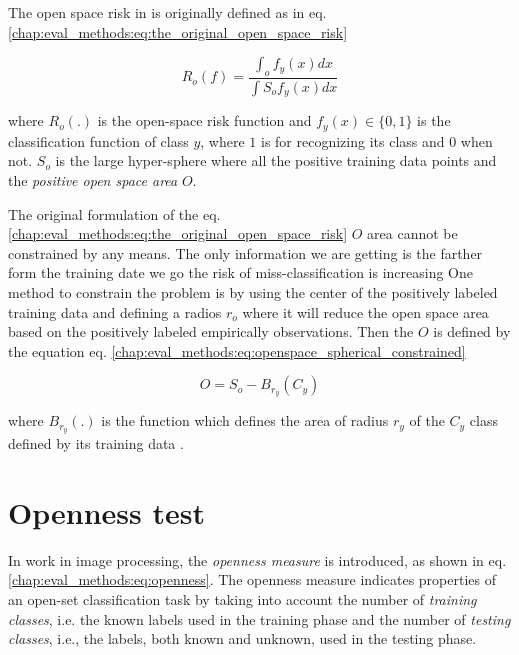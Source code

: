 {The open space risk in \parencite{scheirer2013toward} is originally defined as in eq. \ref{chap:eval_methods:eq:the_original_open_space_risk}

\begin{equation}\label{chap:eval_methods:eq:the_original_open_space_risk}
	R_{o}(f) = \frac{\int_{o} f_{y}(x) dx}{\int{S_{o}}  f_{y}(x) dx}

\end{equation}

\noindent
where $R_{o}(.)$ is the open-space risk function and $f_{y}(x)  \in \{0, 1\}$ is the classification function of class $y$, where $1$ is for recognizing its class and $0$ when not. $S_{o}$ is the large hyper-sphere where all the positive training data points and the \textit{positive open space area} $O$. 

The original formulation of the eq. \ref{chap:eval_methods:eq:the_original_open_space_risk} $O$ area cannot be constrained by any means. The only information we are getting is the farther form the training date we go the risk of miss-classification is increasing One method to constrain the problem is by using the center of the positively labeled training data and defining a radios $r_{o}$ where it will reduce the open space area based on the positively labeled empirically observations. Then the $O$ is defined by the equation eq. \ref{chap:eval_methods:eq:openspace_spherical_constrained}

\begin{equation}\label{chap:eval_methods:eq:openspace_spherical_constrained}
	O = S_{o} - B_{r_{y}}(C_{y})
\end{equation}

\noindent
where $B_{r_{y}}(.)$ is the function which defines the area of radius $r_{y}$ of the $C_{y}$ class defined by its training data \parencite{fei2016breaking}.

\section{Openness test}\label{chap:eval_methods:sec:open_space_risk}

In \parencite{scheirer2013toward} work in image processing, the \textit{openness measure} is introduced, as shown in eq. \ref{chap:eval_methods:eq:openness}. The openness measure indicates properties of an open-set classification task by taking into account the number of \textit{training classes}, i.e. the known labels used in the training phase and the number of \textit{testing classes}, i.e., the labels, both known and unknown, used in the testing phase.

}
